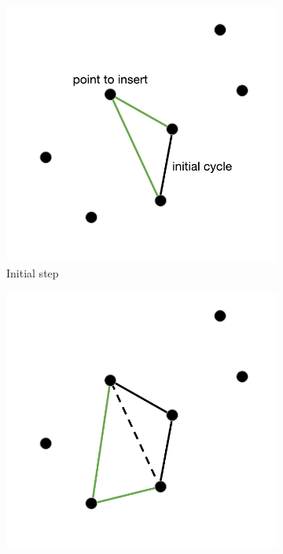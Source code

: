 \begin{figure}[h!]
  \centering
  \begin{subfigure}[b]{0.49\linewidth}
    \includegraphics[width=\linewidth]{media/insertion1.pdf}
     \caption{Initial step}
  \end{subfigure}
  \begin{subfigure}[b]{0.49\linewidth}
    \includegraphics[width=\linewidth]{media/insertion2.pdf}

\end{subfigure}
\end{figure}
